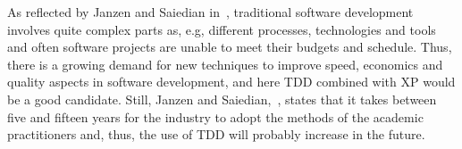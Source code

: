 As reflected by Janzen and Saiedian in~\cite{janzen2}, traditional software development involves quite complex parts as, e.g, different processes, technologies and tools and often software projects are unable to meet their budgets and schedule. Thus, there is a growing demand for new techniques to improve speed, economics and quality aspects in software development, and here TDD combined with XP would be a good candidate. Still, Janzen and Saiedian,~\cite{janzen2}, states that it takes between five and fifteen years for the industry to adopt the methods of the academic practitioners and, thus, the use of TDD will probably increase in the future. 